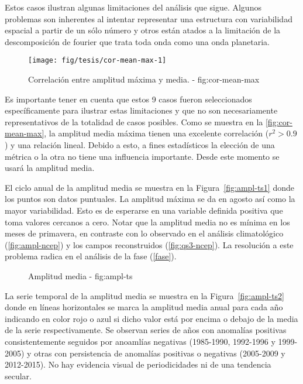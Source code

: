 \documentclass[spanish,a4paper]{book}
\begin{document}
Estos casos ilustran algunas limitaciones del análisis que sigue.
Algunos problemas son inherentes al intentar representar una estructura
con variabilidad espacial a partir de un sólo número y otros están
atados a la limitación de la descomposición de fourier que trata toda
onda como una onda
planetaria.

\begin{figure*}
\texttt{[image: fig/tesis/cor-mean-max-1]} \caption{Correlación entre amplitud máxima y media. - fig:cor-mean-max}\label{fig:cor-mean-max}
\end{figure*}

Es importante tener en cuenta que estos 9 casos fueron seleccionados
específicamente para ilustrar estas limitaciones y que no son
necesariamente representativos de la totalidad de casos posibles. Como
se muestra en la \autoref{fig:cor-mean-max}, la amplitud media máxima
tienen una excelente correlación (\(r^2>0.9\)) y una relación lineal.
Debido a esto, a fines estadísticos la elección de una métrica o la otra
no tiene una influencia importante. Desde este momento se usará la
amplitud media.

El ciclo anual de la amplitud media se muestra en la
Figura~\ref{fig:ampl-ts1} donde los puntos son datos puntuales. La
amplitud máxima se da en agosto así como la mayor variabilidad. Esto es
de esperarse en una variable definida positiva que toma valores cercanos
a cero. Notar que la amplitud media no es mínima en los meses de
primavera, en contraste con lo observado en el análisis climatológico
(\autoref{fig:ampl-ncep}) y los campos reconstruidos
(\autoref{fig:qs3-ncep}). La resolución a este problema radica en el
análisis de la fase (\autoref{fase}).

\begin{figure*}
\newline{}\caption{Amplitud media - fig:ampl-ts}\label{fig:ampl-ts}
\end{figure*}

La serie temporal de la amplitud media se muestra en la
Figura~\ref{fig:ampl-ts2} donde en líneas horizontales se marca la
amplitud media anual para cada año indicando en color rojo o azul si
dicho valor está por encima o debajo de la media de la serie
respectivamente. Se observan series de años con anomalías positivas
consistentemente seguidos por anoamlías negativas (1985-1990, 1992-1996
y 1999-2005) y otras con persistencia de anomalías positivas o negativas
(2005-2009 y 2012-2015). No hay evidencia visual de periodicidades ni de
una tendencia secular.
\end{document}
